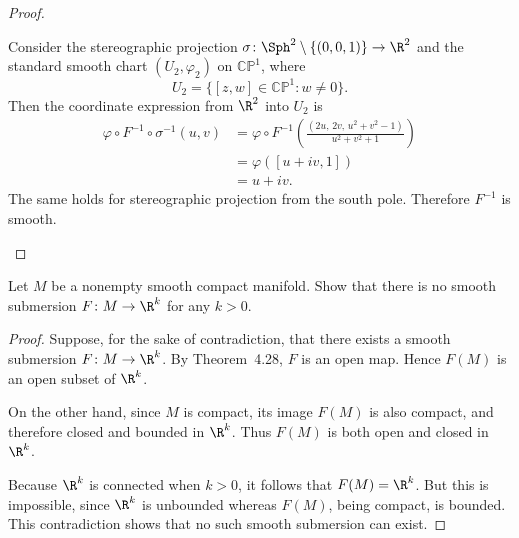 \begin{problem}
\begin{proof}
\begin{enumerate}
            Consider the stereographic projection $\sigma \colon \Sph^2 \setminus \{(0,0,1)\} \to \R^2$ and the standard smooth chart $(U_2,\varphi_2)$ on $\mathbb{CP}^1$, where
            \[
            U_2 = \{[z,w] \in \mathbb{CP}^1 : w \neq 0\}.
            \]
            Then the coordinate expression from $\R^2$ into $U_2$ is
            \begin{align*}
                \varphi \circ F^{-1} \circ \sigma^{-1}(u,v)
                &= \varphi \circ F^{-1}\!\left(\frac{(2u,\,2v,\,u^2+v^2-1)}{u^2+v^2+1}\right) \\
                &= \varphi([u+iv,1]) \\
                &= u+iv.
            \end{align*}
            The same holds for stereographic projection from the south pole. Therefore $F^{-1}$ is smooth.
        \end{enumerate}
    \end{proof}
\end{problem}

\begin{problem}
    Let $M$ be a nonempty smooth compact manifold. Show that there is no smooth submersion $F \colon M \to \R^k$ for any $k > 0$.
    \begin{proof}
    Suppose, for the sake of contradiction, that there exists a smooth submersion 
    $F \colon M \to \R^k$. By Theorem~4.28, $F$ is an open map. Hence $F(M)$ is an open subset of $\R^k$.  

    On the other hand, since $M$ is compact, its image $F(M)$ is also compact, and therefore closed and bounded in $\R^k$. Thus $F(M)$ is both open and closed in $\R^k$.  

    Because $\R^k$ is connected when $k>0$, it follows that $F(M) = \R^k$. But this is impossible, since $\R^k$ is unbounded whereas $F(M)$, being compact, is bounded. This contradiction shows that no such smooth submersion can exist.
    \end{proof}
\end{problem}

